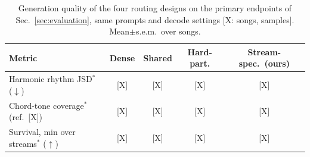 \begin{table}[t]
  \caption{Generation quality of the four routing designs on the
    primary endpoints of Sec.~\ref{sec:evaluation}, same prompts and
    decode settings [X: songs, samples]. Mean$\pm$s.e.m.\ over songs.}
  \label{tab:routing_quality}
  \begin{center}
  \footnotesize
  \setlength{\tabcolsep}{4pt}
  \begin{tabular}{|l|c|c|c|c|}
  \hline
  \textbf{Metric} & \textbf{Dense} & \textbf{Shared} &
    \textbf{Hard-part.} & \textbf{Stream-spec.\ (ours)} \\
  \hline
  Harmonic rhythm JSD$^*$ ($\downarrow$) & [X] & [X] & [X] & [X] \\
  Chord-tone coverage$^*$ (ref.\ [X]) & [X] & [X] & [X] & [X] \\
  Survival, min over streams$^*$ ($\uparrow$) & [X] & [X] & [X] & [X] \\
  \hline
  \end{tabular}
  \end{center}
\end{table}

